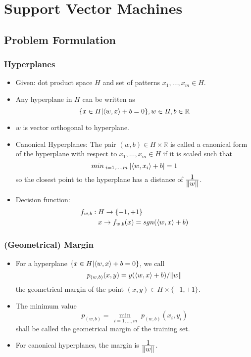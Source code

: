 \documentclass{scrartcl}
\newcommand{\ffrac}[2]{\ensuremath{\frac{\displaystyle #1}{\displaystyle #2}}}
\DeclarePairedDelimiter\abs{\lvert}{\rvert}%
\DeclarePairedDelimiter\norm{\lVert}{\rVert}%
\DeclarePairedDelimiter\inner{\langle}{\rangle}%
\begin{document}
\section{Support Vector Machines}
\subsection{Problem Formulation}
\subsubsection{Hyperplanes}
\begin{itemize}
    \item
        Given: dot product space $H$ and set of patterns $x_{1}, \dots, x_{m} \in H$.
    \item
        Any hyperplane in $H$ can be written as 
        $$\{x \in H | \inner{w, x} + b = 0\}, w \in H, b \in \mathbb{R}$$
    \item
        $w$ is vector orthogonal to hyperplane.
    \item
        Canonical Hyperplanes: 
        The pair $(w,b) \in H \times \mathbb{R}$ is called a canonical form of the hyperplane with respect to $x_{1}, \dots, x_{m} \in H$ if it is scaled such that
        $$ min_{\; i=1, \dots, m \;} \abs{\inner{w, x_{i}} + b} = 1$$
        so the closest point to the hyperplane has a distance of \ffrac{1}{\norm{w}}.
    \item
        Decision function:
        \begin{align*}
        f_{w,b}: \; & H \rightarrow \{-1, +1\}\\
            & x \rightarrow f_{w,b}(x) = sgn(\inner{w,x}+b)
        \end{align*}
\end{itemize}

\subsubsection{(Geometrical) Margin}
\begin{itemize}
    \item
        For a hyperplane $\{x \in H | \inner{w,x} +b = 0\}$, we call
        $$ p_{(w, b)}(x,y) = y(\inner{w,x}+b)/\norm{w}$$
        the geometrical margin of the point $(x,y) \in H \times \{-1, +1\}$.

    \item
        The minimum value
        $$ p_{(w, b)} = \min_{\;i=1,\dots,m} \;p_{(w, b)}(x_{i},y_{i})$$
        shall be called the geometrical margin of the training set.
    \item
        For canonical hyperplanes, the margin is $\ffrac{1}{\norm{w}}$.
\end{itemize}
\end{document}
